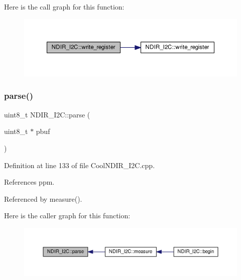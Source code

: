 Here is the call graph for this function\+:
\nopagebreak
\begin{figure}[H]
\begin{center}
\leavevmode
\includegraphics[width=350pt]{d6/ddb/class_n_d_i_r___i2_c_a8ad2a76f9866b0a1f34810a147b4b20d_cgraph}
\end{center}
\end{figure}
\mbox{\label{class_n_d_i_r___i2_c_a907b756fc9244c7398b7d187b73cde94}} 
\subsubsection{\texorpdfstring{parse()}{parse()}}
{\footnotesize\ttfamily uint8\+\_\+t N\+D\+I\+R\+\_\+\+I2\+C\+::parse (\begin{DoxyParamCaption}\item[{uint8\+\_\+t $\ast$}]{pbuf }\end{DoxyParamCaption})\hspace{0.3cm}{\ttfamily [private]}}



Definition at line 133 of file Cool\+N\+D\+I\+R\+\_\+\+I2\+C.\+cpp.



References ppm.



Referenced by measure().

Here is the caller graph for this function\+:
\nopagebreak
\begin{figure}[H]
\begin{center}
\leavevmode
\includegraphics[width=350pt]{d6/ddb/class_n_d_i_r___i2_c_a907b756fc9244c7398b7d187b73cde94_icgraph}
\end{center}
\end{figure}


